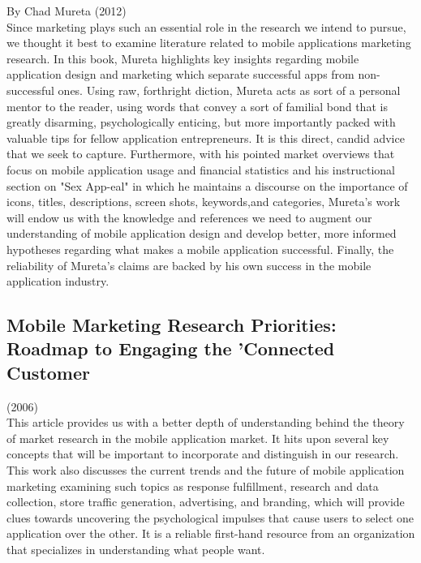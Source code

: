 \documentclass{article}
\begin{document}
By Chad Mureta (2012) \\

Since marketing plays such an essential role in the research we intend to pursue, we thought it best to examine literature related to mobile applications marketing research. In this book, Mureta highlights key insights regarding mobile application design and marketing which separate successful apps from non-successful ones.  Using raw, forthright diction, Mureta acts as sort of a personal mentor to the reader, using words that convey a sort of familial bond that is greatly disarming, psychologically enticing, but more importantly packed with valuable tips for fellow application entrepreneurs.  It is this direct, candid advice that we seek to capture.  Furthermore, with his pointed market overviews that focus on mobile application usage and financial statistics and his instructional section on "Sex App-eal" in which he maintains a discourse on the importance of icons, titles, descriptions, screen shots, keywords,and categories, Mureta's work will endow us with the knowledge and references we need to augment our understanding of mobile application design and develop better, more informed hypotheses regarding what makes a mobile application successful. Finally, the reliability of Mureta's claims are backed by his own success in the mobile application industry.\cite {mureta} \\

\subsection{Mobile Marketing Research Priorities: Roadmap to Engaging the 'Connected Customer}

(2006) \\

This article provides us with a better depth of understanding behind the theory of market research in the mobile application market. It hits upon several key concepts that will be important to incorporate and distinguish in our research.  This work also discusses the current trends and the future of mobile application marketing examining such topics as response fulfillment, research and data collection, store traffic generation, advertising, and branding, which will provide clues towards uncovering the psychological impulses that cause users to select one application over the other. It is a reliable first-hand resource from an organization that specializes in understanding what people want.\\
\end{document}

